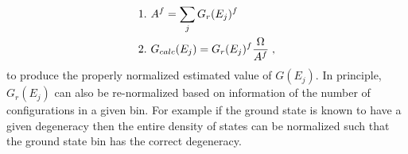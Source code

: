 \documentclass[aps,pre,reprint,superscriptaddress,showkeys]{revtex4-2}
\begin{document}
\begin{equation}
\begin{split}
&1. \hspace{0.125cm} A^f = \sum_jG_{r}(E_j)^f\\
&2. \hspace{0.125cm} G_{calc}(E_j) = G_{r}(E_j)^f \frac{\Omega}{A^f} \;,
\end{split}
\label{renormalize}
\end{equation}
to produce the properly normalized estimated value of $G(E_j)$. In principle, $G_{r}(E_j)$ can also be re-normalized based on information of the number of configurations in a given bin. For example if the ground state is known to have a given degeneracy then the entire density of states can be normalized such that the ground state bin has the correct degeneracy. 

 
\end{document}
